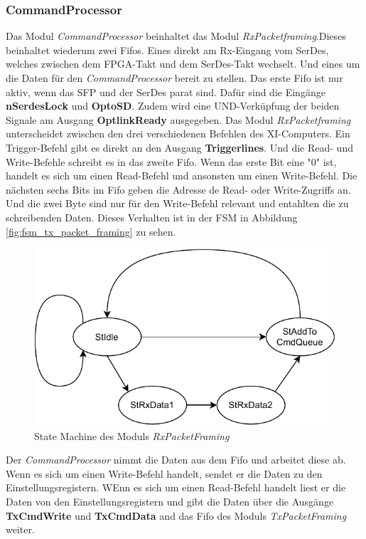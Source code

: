 \documentclass{article}
\begin{document}
\subsubsection*{CommandProcessor}
Das Modul \textit{CommandProcessor} beinhaltet das Modul \textit{RxPacketframing}.Dieses beinhaltet wiederum zwei Fifos. Eines direkt am Rx-Eingang vom SerDes, welches zwischen dem FPGA-Takt und dem SerDes-Takt wechselt. Und eines um die Daten für den \textit{CommandProcessor} bereit zu stellen. Das erste Fifo ist nur aktiv, wenn das SFP und der SerDes parat sind. Dafür sind die Eingänge \textbf{nSerdesLock} und \textbf{OptoSD}. Zudem wird eine UND-Verküpfung der beiden Signale am Ausgang \textbf{OptlinkReady} ausgegeben. Das Modul \textit{RxPacketframing} unterscheidet zwischen den drei verschiedenen Befehlen des XI-Computers. Ein Trigger-Befehl gibt es direkt an den Ausgang \textbf{Triggerlines}. Und die Read- und Write-Befehle schreibt es in das zweite Fifo. Wenn das erste Bit eine "0" ist, handelt es sich um einen Read-Befehl und ansonsten um einen Write-Befehl. Die nächsten sechs Bits im Fifo geben die Adresse de Read- oder Write-Zugriffs an. Und die zwei Byte sind nur für den Write-Befehl relevant und entahlten die zu schreibenden Daten. Dieses Verhalten ist in der FSM in Abbildung \ref{fig:fsm_tx_packet_framing} zu sehen.

\begin{figure}[tb]
    \includegraphics[width=\linewidth]{drawio/fsm_rx_packet_framing}
    \caption{State Machine des Moduls \textit{RxPacketFraming}}
    \label{fig:fsm_rx_packet_framing}
\end{figure}

Der \textit{CommandProcessor} nimmt die Daten aus dem Fifo und arbeitet diese ab. Wenn es sich um einen Write-Befehl handelt, sendet er die Daten zu den Einstellungsregistern. WEnn es sich um einen Read-Befehl handelt liest er die Daten von den Einstellungsregistern und gibt die Daten über die Ausgänge \textbf{TxCmdWrite} und \textbf{TxCmdData} and das Fifo des Moduls \textit{TxPacketFraming} weiter.
\end{document}

